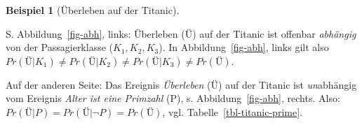 \documentclass[
  ngerman,
  letterpaper,
  twoside,
  open=any]{scrbook}
\theoremstyle{definition}
\newtheorem{example}{Beispiel}[chapter]
\theoremstyle{plain}
\theoremstyle{definition}
\theoremstyle{definition}
\theoremstyle{definition}
\newtheorem{example}{Beispiel}[chapter]
\theoremstyle{definition}
\theoremstyle{remark}
\begin{document}
\begin{example}[Überleben auf der
Titanic]\protect\hypertarget{exm-titanic}{}\label{exm-titanic}

S. Abbildung~\ref{fig-abh}, links: Überleben (Ü) auf der Titanic ist
offenbar \emph{abhängig} von der Passagierklasse (\(K_1, K_2, K_3\)). In
Abbildung~\ref{fig-abh}, links gilt also
\(Pr(Ü|K_1) \ne Pr(Ü|K_2) \ne Pr(Ü|K_3) \ne Pr(Ü)\).

Auf der anderen Seite: Das Ereignis \emph{Überleben} (Ü) auf der Titanic
ist \emph{un}abhängig vom Ereignis \emph{Alter ist eine Primzahl} (P),
s. Abbildung~\ref{fig-abh}, rechts. Also:
\(Pr(Ü|P) = Pr(Ü|\neg P) = Pr(Ü)\), vgl.
Tabelle~\ref{tbl-titanic-prime}.

\begin{table}

\caption{\label{tbl-titanic-prime}Kontingenztabelle (Häufigkeiten) für
\enquote*{Überleben auf der Titanic} und \enquote*{Alter ist Primzahl}.
Wie man sieht, gibt es keine stochastische Abhängigkeit.}


\end{table}%

\end{example}
\end{document}
